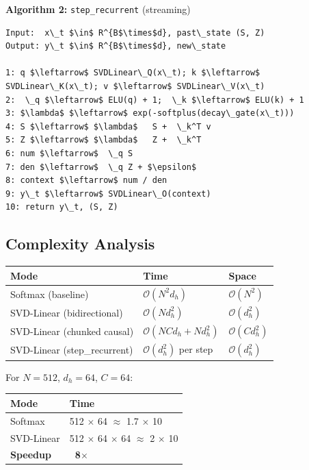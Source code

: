 \textbf{Algorithm 2:} \texttt{step\_recurrent} (streaming)
\begin{lstlisting}
Input:  x\_t $\in$ R^{B$\times$d}, past\_state (S, Z)
Output: y\_t $\in$ R^{B$\times$d}, new\_state

1: q $\leftarrow$ SVDLinear\_Q(x\_t); k $\leftarrow$ SVDLinear\_K(x\_t); v $\leftarrow$ SVDLinear\_V(x\_t)
2:  \_q $\leftarrow$ ELU(q) + 1;  \_k $\leftarrow$ ELU(k) + 1
3: $\lambda$ $\leftarrow$ exp(-softplus(decay\_gate(x\_t)))
4: S $\leftarrow$ $\lambda$   S +  \_k^T v
5: Z $\leftarrow$ $\lambda$   Z +  \_k^T
6: num $\leftarrow$  \_q S
7: den $\leftarrow$  \_q Z + $\epsilon$
8: context $\leftarrow$ num / den
9: y\_t $\leftarrow$ SVDLinear\_O(context)
10: return y\_t, (S, Z)
\end{lstlisting}

\subsection{Complexity Analysis}

\begin{table}[H]
\centering
\small
\begin{tabular}{lll}
\toprule
\textbf{Mode} & \textbf{Time} & \textbf{Space} \\
\midrule
Softmax (baseline) & $\mathcal{O}(N^2 d_h)$ & $\mathcal{O}(N^2)$ \\
SVD-Linear (bidirectional) & $\mathcal{O}(N d_h^2)$ & $\mathcal{O}(d_h^2)$ \\
SVD-Linear (chunked causal) & $\mathcal{O}(N C d_h + N d_h^2)$ & $\mathcal{O}(C d_h^2)$ \\
SVD-Linear (step\_recurrent) & $\mathcal{O}(d_h^2)$ per step & $\mathcal{O}(d_h^2)$ \\
\bottomrule
\end{tabular}
\end{table}

For $N = 512$, $d_h = 64$, $C = 64$:

\begin{table}[H]
\centering
\small
\begin{tabular}{ll}
\toprule
\textbf{Mode} & \textbf{Time} \\
\midrule
Softmax & 512  $\times$ 64 $\approx$ 1.7 $\times$ 10 \\
SVD-Linear & 512 $\times$ 64 $\times$ 64 $\approx$ 2 $\times$ 10 \\
\textbf{Speedup} & \textbf{~8$\times$} \\
\bottomrule
\end{tabular}
\end{table}

